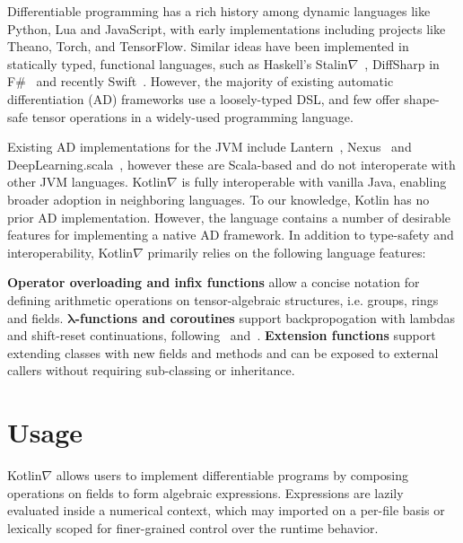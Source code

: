 \documentclass[12pt,initial,twoside,maitrise]{dms}
\numberwithin{equation}{section}
\numberwithin{table}{chapter}
\numberwithin{figure}{chapter}
\begin{document}
Differentiable programming has a rich history among dynamic languages like Python, Lua and JavaScript, with early implementations including projects like Theano, Torch, and TensorFlow. Similar ideas have been implemented in statically typed, functional languages, such as Haskell's Stalin$\nabla$~\cite{pearlmutter2008using}, DiffSharp in F\#~\cite{baydin-diffsharp} and recently Swift~\cite{swift}. However, the majority of existing automatic differentiation (AD) frameworks use a loosely-typed DSL, and few offer shape-safe tensor operations in a widely-used programming language.

Existing AD implementations for the JVM include Lantern~\cite{DBLP:journals-corr-abs-1803-10228}, Nexus~\cite{chen2017typesafe} and DeepLearning.scala~\cite{dl4s}, however these are Scala-based and do not interoperate with other JVM languages. Kotlin$\nabla$ is fully interoperable with vanilla Java, enabling broader adoption in neighboring languages. To our knowledge, Kotlin has no prior AD implementation. However, the language contains a number of desirable features for implementing a native AD framework. In addition to type-safety and interoperability, Kotlin$\nabla$ primarily relies on the following language features:

\textbf{Operator overloading and infix functions} allow a concise notation for defining arithmetic operations on tensor-algebraic structures, i.e. groups, rings and fields.
\textbf{$\mathbf{\lambda}$-functions and coroutines} support backpropogation with lambdas and shift-reset continuations, following~\cite{pearlmutter2008reverse} and~\cite{DBLP:journals-corr-abs-1803-10228}.
\textbf{Extension functions} support extending classes with new fields and methods and can be exposed to external callers without requiring sub-classing or inheritance.

\section{Usage}

Kotlin$\nabla$ allows users to implement differentiable programs by composing operations on fields to form algebraic expressions. Expressions are lazily evaluated inside a numerical context, which may imported on a per-file basis or lexically scoped for finer-grained control over the runtime behavior.
\end{document}
